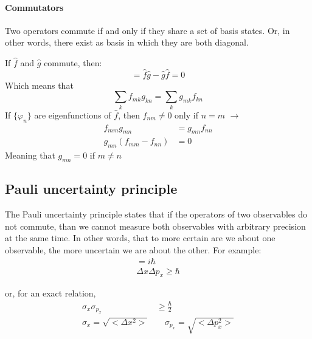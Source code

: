 				\paragraph{Commutators}
					Two operators commute if and only if they share a set of basis states. Or, in other words, there exist as basis in which they are both diagonal.
					
					If $\hat{f}$ and $\hat{g}$ commute, then:
					\begin{equation}
						[\hat{f}, \hat{g}] = \hat{f}\hat{g} - \hat{g}\hat{f} = 0
					\end{equation}
					Which means that	
					\begin{equation}
						\sum_k f_{mk}g_{kn} = \sum_k  g_{mk}f_{kn}
					\end{equation}
					If $\{\varphi_n\}$ are eigenfunctions of $\hat{f}$, then $f_{nm} \not= 0$ only if $n=m$ $\rightarrow$
					\begin{align}
						f_{mm}g_{mn} &= g_{mn} f_{nn} \nonumber \\
						g_{mn} (f_{mm} - f_{nn}) &= 0
					\end{align}
					Meaning that $g_{mn} = 0$ if $m \not= n$ 
				
	\subsection{Pauli uncertainty principle}
		The Pauli uncertainty principle states that if the operators of two observables do not commute, than we cannot measure both observables with arbitrary precision at the same time. In other words, that to more certain are we about one observable, the more uncertain we are about the other. For example:
		\begin{align}
			[\hat{x}, \hat{p_x}] = i\hbar \\
			\Delta x \Delta p_x \geq \hbar
		\end{align} 
		
		or, for an exact relation,
		\begin{align}
			\sigma_{x} \sigma_{p_x} &\geq \frac{\hbar}{2}\\
			\sigma_{x} = \sqrt{<\Delta x^2>}&\quad 
			\sigma_{p_x} = \sqrt{<\Delta p_x^2>} \\
		\end{align}
		
		
